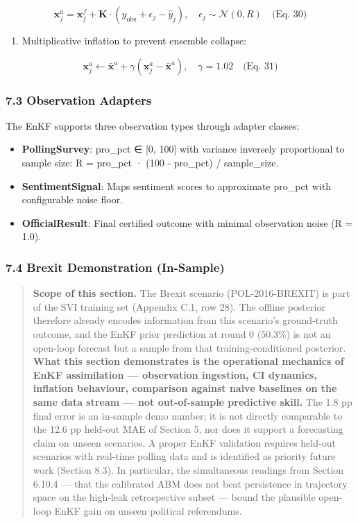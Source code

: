 \documentclass[
]{article}
\providecommand{\tightlist}{%
  \setlength{\itemsep}{0pt}\setlength{\parskip}{0pt}}
\begin{document}
\[\mathbf{x}_j^a = \mathbf{x}_j^f + \mathbf{K} \cdot (y_{\text{obs}} + \epsilon_j - \hat{y}_j), \quad \epsilon_j \sim \mathcal{N}(0, R) \quad \text{(Eq. 30)}\]

\begin{enumerate}
\def\labelenumi{\arabic{enumi}.}
\setcounter{enumi}{5}
\tightlist
\item
  Multiplicative inflation to prevent ensemble collapse:
\end{enumerate}

\[\mathbf{x}_j^a \leftarrow \bar{\mathbf{x}}^a + \gamma (\mathbf{x}_j^a - \bar{\mathbf{x}}^a), \quad \gamma = 1.02 \quad \text{(Eq. 31)}\]

\subsubsection{7.3 Observation Adapters}\label{observation-adapters}

The EnKF supports three observation types through adapter classes:

\begin{itemize}
\tightlist
\item
  \textbf{PollingSurvey}: pro\_pct ∈ {[}0, 100{]} with variance
  inversely proportional to sample size: R = pro\_pct · (100 - pro\_pct)
  / sample\_size.
\item
  \textbf{SentimentSignal}: Maps sentiment scores to approximate
  pro\_pct with configurable noise floor.
\item
  \textbf{OfficialResult}: Final certified outcome with minimal
  observation noise (R = 1.0).
\end{itemize}

\subsubsection{7.4 Brexit Demonstration
(In-Sample)}\label{brexit-demonstration-in-sample}

\begin{quote}
\textbf{Scope of this section.} The Brexit scenario (POL-2016-BREXIT) is
part of the SVI training set (Appendix C.1, row 28). The offline
posterior therefore already encodes information from this scenario's
ground-truth outcome, and the EnKF prior prediction at round 0 (50.3\%)
is not an open-loop forecast but a sample from that training-conditioned
posterior. \textbf{What this section demonstrates is the operational
mechanics of EnKF assimilation --- observation ingestion, CI dynamics,
inflation behaviour, comparison against naive baselines on the same data
stream --- not out-of-sample predictive skill.} The 1.8 pp final error
is an in-sample demo number; it is not directly comparable to the 12.6
pp held-out MAE of Section 5, nor does it support a forecasting claim on
unseen scenarios. A proper EnKF validation requires held-out scenarios
with real-time polling data and is identified as priority future work
(Section 8.3). In particular, the simultaneous readings from Section
6.10.4 --- that the calibrated ABM does not beat persistence in
trajectory space on the high-leak retrospective subset --- bound the
plausible open-loop EnKF gain on unseen political referendums.
\end{quote}
\end{document}
